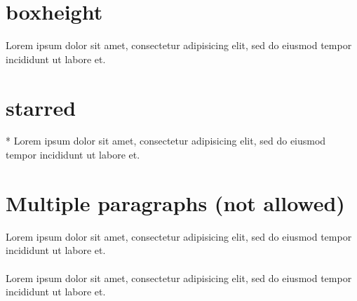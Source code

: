 \documentclass{article}
\begin{document}
\section{boxheight}

\clozereset

\begin{clozebox}[boxwidth=5cm,boxheight=5cm]
Lorem ipsum dolor sit amet, consectetur adipisicing elit, sed do eiusmod
tempor incididunt ut labore et.
\end{clozebox}

\section{starred}

\begin{clozebox}*
Lorem ipsum dolor sit amet, consectetur adipisicing elit, sed do eiusmod
tempor incididunt ut labore et.
\end{clozebox}

\section{Multiple paragraphs (not allowed)}

\begin{clozebox}
\noindent
Lorem ipsum dolor sit amet, consectetur adipisicing elit, sed do eiusmod
tempor incididunt ut labore et.\\\\
%
Lorem ipsum dolor sit amet, consectetur adipisicing elit, sed do eiusmod
tempor incididunt ut labore et.
\end{clozebox}
\end{document}
